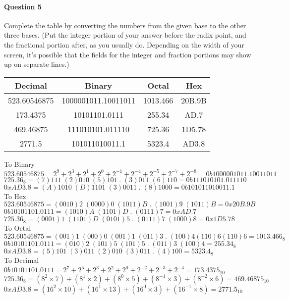 \documentclass[12pt,letterpaper,notitlepage]{report}
\begin{document}
\paragraph{Question 5} 
Complete the table by converting the numbers from the given base to the other three bases. (Put the integer portion of your answer before the radix point, and the fractional portion after, as you usually do. Depending on the width of your screen, it's possible that the fields for the integer and fraction portions may show up on separate lines.)\medskip
\begin{center}
\def\arraystretch{1.5}
\begin{tabular}{ | c | c | c | c | } \hline
Decimal      & Binary              & Octal    & Hex    \\\hline
523.60546875 & 1000001011.10011011 & 1013.466 & 20B.9B \\\hline
173.4375     & 10101101.0111       & 255.34   & AD.7   \\\hline
469.46875    & 111010101.011110    & 725.36   & 1D5.78 \\\hline
2771.5       & 101011010011.1      & 5323.4   & AD3.8  \\\hline
\end{tabular}
\end{center}
To Binary
\\$ 523.60546875 = 2^9+2^3+2^1+2^0+2^{-1}+2^{-4}+2^{-5}+2^{-7}+2^{-8} = 0b1000001011.10011011 $
\\$ 725.36_8 = (7)111\; (2)010\; (5)101\; .\; (3)011\; (6)110 = 0b111010101.011110$
\\$ 0xAD3.8 = (A)1010\; (D)1101\; (3)0011 \;.\; (8)1000 = 0b101011010011.1$
\\To Hex
\\$ 523.60546875 = (0010)2\; (0000)0\; (1011)B\; .\; (1001)9\; (1011)B = 0x20B.9B $
\\$ 0b10101101.0111 = (1010)A\; (1101)D \;.\; (0111)7 = 0xAD.7$
\\$ 725.36_8 = (0001)1 \;(1101)D \;(0101)5\; . \;(0111)7 \;(1000)8 = 0x1D5.78$
\\To Octal
\\$ 523.60546875 = (001)1\; (000)0\; (001)1\; (011)3 \;.\; (100)4 (110)6 (110)6 = 1013.466_8 $
\\$ 0b10101101.0111 = (010)2 \;(101)5 \;(101)5 \;.\; (011)3 \;(100)4 = 255.34_8$
\\$ 0xAD3.8 = (5)101\; (3)011\; (2)010\; (3)011 \;. \; (4)100 = 5323.4_8$
\\To Decimal
\\$ 0b10101101.0111 = 2^7+2^5+2^3+2^2 + 2^0 + 2^{-2} + 2^{-3} + 2^{-4} = 173.4375_{10}$
\\$ 725.36_8 = (8^2\times7)+(8^1\times2)+(8^0\times5)+(8^{-1}\times3)+(8^{-2}\times6) = 469.46875_{10}$
\\$ 0xAD3.8 = (16^2\times10)+(16^1\times13)+(16^0\times3)+(16^{-1}\times8) = 2771.5_{10} $
\end{document}
